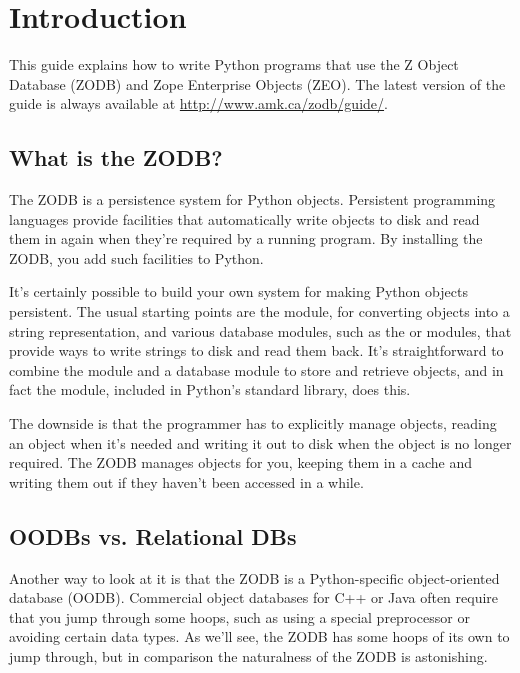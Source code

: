 

\section{Introduction}

This guide explains how to write Python programs that use the Z Object
Database (ZODB) and Zope Enterprise Objects (ZEO).  The latest version
of the guide is always available at
\url{http://www.amk.ca/zodb/guide/}.

\subsection{What is the ZODB?}

The ZODB is a persistence system for Python objects.  Persistent
programming languages provide facilities that automatically write
objects to disk and read them in again when they're required by a
running program.  By installing the ZODB, you add such facilities to
Python.

It's certainly possible to build your own system for making Python
objects persistent.  The usual starting points are the 
module, for converting objects into a string representation, and
various database modules, such as the  or 
modules, that provide ways to write strings to disk and read them
back.  It's straightforward to combine the  module and
a database module to store and retrieve objects, and in fact the
 module, included in Python's standard library, does
this.

The downside is that the programmer has to explicitly manage objects,
reading an object when it's needed and writing it out to disk when the
object is no longer required.  The ZODB manages objects for you,
keeping them in a cache and writing them out if they haven't been 
accessed in a while.  


\subsection{OODBs vs. Relational DBs}

Another way to look at it is that the ZODB is a Python-specific
object-oriented database (OODB).  Commercial object databases for C++
or Java often require that you jump through some hoops, such as using
a special preprocessor or avoiding certain data types.  As we'll see,
the ZODB has some hoops of its own to jump through, but in comparison
the naturalness of the ZODB is astonishing.

